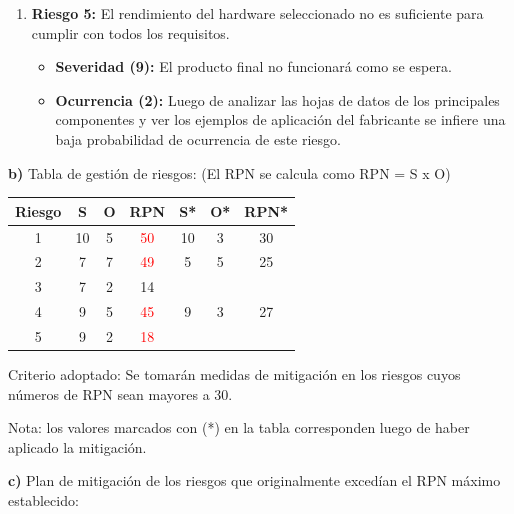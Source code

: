 \documentclass[
11pt, %
codirector, %
]{charter}
\begin{document}
\begin{enumerate}
	\item[] \textbf{Riesgo 5:} El rendimiento del hardware seleccionado no es suficiente para cumplir con todos los requisitos.
	\begin{itemize}
		\item \textbf{Severidad (9):} El producto final no funcionará como se espera. 
		\item \textbf{Ocurrencia (2):} Luego de analizar las hojas de datos de los principales componentes y ver los ejemplos de aplicación del fabricante se infiere una baja probabilidad de ocurrencia de este riesgo.
	\end{itemize}
\end{enumerate}

\textbf{b)} Tabla de gestión de riesgos: (El RPN se calcula como RPN = S x O)

\begin{table}[htpb]
\centering
\begin{tabular}{|c|c|c|c|c|c|c|}
\hline
\rowcolor[HTML]{C0C0C0} 
Riesgo & S & O & 			RPN			 		  & S* & O* & RPN* \\ \hline
1 & 10 & 5 & \textcolor{red}{50} & 10 & 3  &  \textcolor[HTML]{009900}{30} \\ \hline
2      & 7  & 7 & \textcolor{red}{49} & 5 & 5  &  \textcolor[HTML]{009900}{25} \\ \hline
3      & 7  & 2 & \textcolor[HTML]{009900}{14} &  &  & \\ \hline
4      & 9  & 5 & \textcolor{red}{45} & 9 & 3  &  \textcolor[HTML]{009900}{27} \\ \hline
5      & 9  & 2 & \textcolor{red}{18} &  &   & \\ \hline
\end{tabular}
\end{table}

Criterio adoptado: 
Se tomarán medidas de mitigación en los riesgos cuyos números de RPN sean mayores a 30.

Nota: los valores marcados con (*) en la tabla corresponden luego de haber aplicado la mitigación.

\textbf{c)} Plan de mitigación de los riesgos que originalmente excedían el RPN máximo establecido:
\end{document}
